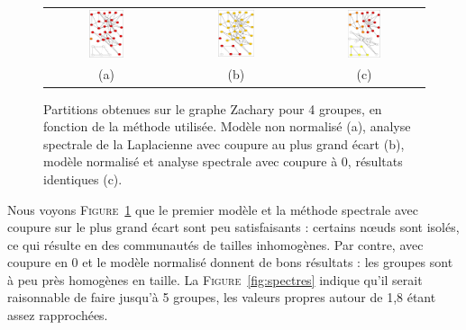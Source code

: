 \documentclass[12pt]{article}
\newcommand{\fig}[1]{\textsc{Figure}~\ref{#1}}
\begin{document}
\begin{figure}[bth]
	\begin{center}
		\begin{tabular}[h]{ccc}
		\includegraphics[width=0.30\textwidth]{new_plots/za-m1}&
		\includegraphics[width=0.30\textwidth]{new_plots/za-sp-ge}&
		\includegraphics[width=0.30\textwidth]{new_plots/za-m2}
		\\
		(a) & (b) & (c)
		\end{tabular}
	\end{center}
	\caption{Partitions obtenues sur le graphe Zachary pour 4 groupes, en fonction de la méthode utilisée. Modèle non normalisé (a),
	analyse spectrale de la Laplacienne avec coupure au plus grand écart (b), modèle normalisé et analyse spectrale avec
	coupure à 0, résultats identiques (c).}
	\label{fig:partitions-za}
\end{figure}

Nous voyons \fig{fig:partitions-za} que le premier modèle et la méthode spectrale avec coupure sur le plus grand écart sont peu
satisfaisants : certains n\oe uds sont isolés, ce qui résulte en des communautés de tailles inhomogènes. Par contre, avec coupure
en 0 et le modèle normalisé donnent de bons résultats : les groupes sont à peu près homogènes en taille. La
\fig{fig:spectres} indique qu'il serait raisonnable de faire jusqu'à 5 groupes, les valeurs propres autour de 1,8 étant assez
rapprochées.
\end{document}
